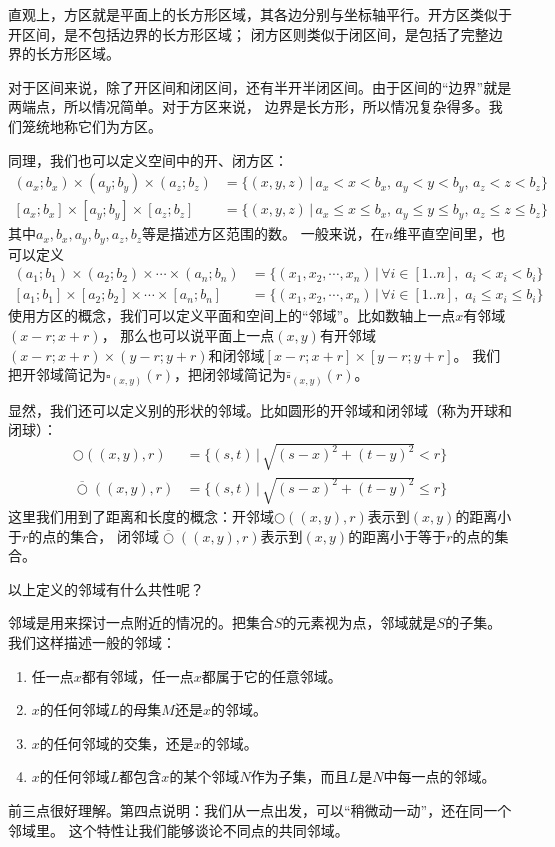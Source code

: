 \documentclass[12pt,UTF8]{ctexbook}
\begin{document}
直观上，方区就是平面上的长方形区域，其各边分别与坐标轴平行。开方区类似于开区间，是不包括边界的长方形区域；
闭方区则类似于闭区间，是包括了完整边界的长方形区域。

对于区间来说，除了开区间和闭区间，还有半开半闭区间。由于区间的“边界”就是两端点，所以情况简单。对于方区来说，
边界是长方形，所以情况复杂得多。我们笼统地称它们为方区。

同理，我们也可以定义空间中的开、闭方区：
\begin{align*}
    (a_x;b_x)\times(a_y;b_y)\times(a_z;b_z) &= \{(x, y, z) \, | \, a_x < x < b_x,\, a_y < y < b_y,\, a_z < z < b_z\} \\
    [a_x;b_x]\times[a_y;b_y]\times[a_z;b_z]\; &= \{(x, y, z) \, | \, a_x \leqslant  x \leqslant b_x,\, a_y \leqslant y \leqslant b_y,\, a_z \leqslant z \leqslant b_z\}
\end{align*}
其中$a_x, b_x, a_y, b_y, a_z, b_z$等是描述方区范围的数。
一般来说，在$n$维平直空间里，也可以定义
\begin{align*}
    (a_1;b_1)\times(a_2;b_2)\times\cdots\times(a_n;b_n) &= \{(x_1, x_2, \cdots, x_n) \, | \, \forall i\in[1..n],\,\, a_i < x_i < b_i\} \\
    [a_1;b_1]\times[a_2;b_2]\times\cdots\times[a_n;b_n]\; &= \{(x_1, x_2, \cdots, x_n) \, | \, \forall i\in[1..n],\,\, a_i \leqslant x_i \leqslant b_i\} 
\end{align*}
使用方区的概念，我们可以定义平面和空间上的“邻域”。比如数轴上一点$x$有邻域$(x-r;x+r)$，
那么也可以说平面上一点$(x, y)$有开邻域$(x-r;x+r)\times(y-r;y+r)$和闭邻域$[x-r;x+r]\times[y-r;y+r]$。
我们把开邻域简记为$\square_{(x,y)}(r)$，把闭邻域简记为$\overline{\square}_{(x,y)}(r)$。

显然，我们还可以定义别的形状的邻域。比如圆形的开邻域和闭邻域（称为开球和闭球）：
\begin{align*}
    \bigcirc((x,y),r) &= \{(s, t) \, | \, \sqrt{(s - x)^2 + (t - y)^2} < r\} \\
    \overline{\bigcirc}((x,y),r) &= \{(s, t) \, | \, \sqrt{(s - x)^2 + (t - y)^2} \leqslant r\}
\end{align*}
这里我们用到了距离和长度的概念：开邻域$\bigcirc((x,y),r)$表示到$(x, y)$的距离小于$r$的点的集合，
闭邻域$\overline{\bigcirc}((x,y),r)$表示到$(x, y)$的距离小于等于$r$的点的集合。

以上定义的邻域有什么共性呢？

邻域是用来探讨一点附近的情况的。把集合$S$的元素视为点，邻域就是$S$的子集。我们这样描述一般的邻域：
\begin{enumerate}
    \item 任一点$x$都有邻域，任一点$x$都属于它的任意邻域。
    \item $x$的任何邻域$L$的母集$M$还是$x$的邻域。
    \item $x$的任何邻域的交集，还是$x$的邻域。
    \item $x$的任何邻域$L$都包含$x$的某个邻域$N$作为子集，而且$L$是$N$中每一点的邻域。
\end{enumerate}
前三点很好理解。第四点说明：我们从一点出发，可以“稍微动一动”，还在同一个邻域里。
这个特性让我们能够谈论不同点的共同邻域。
\end{document}
